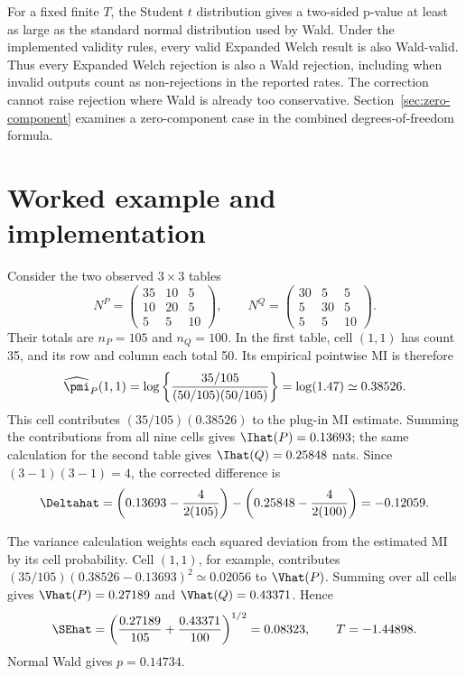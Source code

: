 For a fixed finite \(T\), the Student \(t\) distribution gives a two-sided
p-value at least as large as the standard normal distribution used by Wald.
Under the implemented validity rules, every valid Expanded Welch result is
also Wald-valid. Thus every
Expanded Welch rejection is also a Wald rejection, including when invalid
outputs count as non-rejections in the reported rates. The correction cannot
raise rejection where Wald is already too conservative.
Section~\ref{sec:zero-component} examines a zero-component case in the
combined degrees-of-freedom formula.

\section{Worked example and implementation}

Consider the two observed \(3\times3\) tables
\begin{equation}
  N^P=
  \begin{pmatrix}
  35&10&5\\
  10&20&5\\
  5&5&10
  \end{pmatrix},
  \qquad
  N^Q=
  \begin{pmatrix}
  30&5&5\\
  5&30&5\\
  5&5&10
  \end{pmatrix}.
  \label{eq:worked-tables}
\end{equation}
Their totals are \(n_P=105\) and \(n_Q=100\). In the first table, cell
\((1,1)\) has count 35, and its row and column each total 50. Its empirical
pointwise MI is therefore
\begin{equation*}
 \widehat\pmi_P(1,1)
 =\log\left\{\frac{35/105}{(50/105)(50/105)}\right\}
 =\log(1.47)\simeq0.38526.
\end{equation*}
This cell contributes \((35/105)(0.38526)\) to the plug-in MI estimate.
Summing the contributions from all nine cells gives
\(\Ihat(P)=0.13693\); the same calculation for the second table gives
\(\Ihat(Q)=0.25848\) nats. Since \((3-1)(3-1)=4\), the corrected difference is
\begin{equation}
  \Deltahat
  =\left(0.13693-\frac{4}{2(105)}\right)
  -\left(0.25848-\frac{4}{2(100)}\right)
  =-0.12059.
\end{equation}

The variance calculation weights each squared deviation from the estimated
MI by its cell probability. Cell \((1,1)\), for example, contributes
\((35/105)(0.38526-0.13693)^2\simeq0.02056\) to \(\Vhat(P)\).
Summing over all cells gives \(\Vhat(P)=0.27189\) and
\(\Vhat(Q)=0.43371\). Hence
\begin{equation}
  \SEhat
  =\left(\frac{0.27189}{105}+\frac{0.43371}{100}\right)^{1/2}
  =0.08323,
  \qquad
  T=-1.44898.
\end{equation}
Normal Wald gives \(p=0.14734\).


